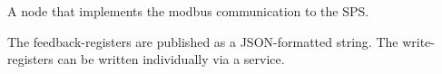 \documentclass[a4paper,12pt,english]{article}
\begin{document}
\label{\detokenize{meso_control_pkg:module-meso_control_pkg.modbus_tcp_node}}

\begin{fulllineitems}
\label{\detokenize{meso_control_pkg:meso_control_pkg.modbus_tcp_node.ModbusTcpNode}}
A node that implements the modbus communication to the SPS.

The feedback-registers are published as a JSON-formatted string.
The write-registers can be written individually via a service.

\end{fulllineitems}
\end{document}
